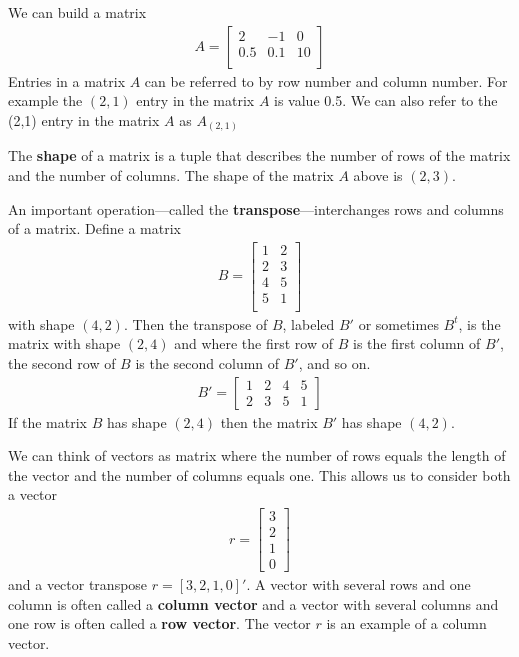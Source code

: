 \ex We can build a matrix 
\begin{align}
    A = \begin{bmatrix}
        2 & -1 & 0 \\
        0.5 & 0.1 & 10 \\
    \end{bmatrix}
\end{align}
Entries in a matrix $A$ can be referred to by row  number and column number. 
For example the $(2,1)$ entry in the matrix $A$ is value 0.5. 
We can also refer to the (2,1) entry in the matrix $A$ as $A_{(2,1)}$

The \textbf{shape} of a matrix is a tuple that describes the number of rows of the matrix and the number of columns. The shape of the matrix $A$ above is $(2,3)$.

An important operation---called the \textbf{transpose}---interchanges rows and columns of a matrix. 
Define a matrix
\begin{align}
    B = \begin{bmatrix}
           1 & 2 \\
           2 & 3 \\
           4 & 5 \\
           5 & 1 \\
        \end{bmatrix}
\end{align}
with shape $(4,2)$.
Then the transpose of $B$, labeled $B'$ or sometimes $B^{t}$, is the matrix with shape $(2,4)$ and where the first row of $B$ is the first column of $B'$, the second row of $B$ is the second column of $B'$, and so on. 
\begin{align}
    B' = \begin{bmatrix}
           1 & 2 & 4 & 5\\
           2 & 3 & 5 & 1
    \end{bmatrix}
\end{align}
If the matrix $B$ has shape $(2,4)$ then the matrix $B'$ has shape $(4,2)$.

We can think of vectors as matrix where the number of rows equals the length of the vector and the number of columns equals one.
This allows us to consider both a vector \begin{align}
    r = \begin{bmatrix}
        3\\
        2\\
        1\\
        0
    \end{bmatrix}
\end{align}
and a vector transpose $r = [3, 2, 1, 0]'$.
A vector with several rows and one column is often called a \textbf{column vector} and a vector with several columns and one row is often called a \textbf{row vector}.
The vector $r$ is an example of a column vector.


